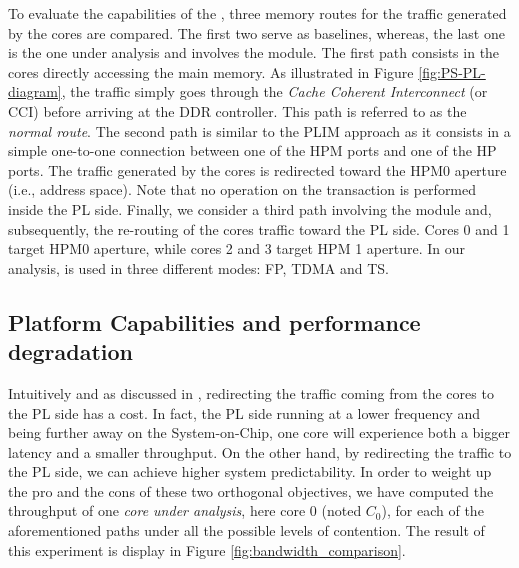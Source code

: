 To evaluate the capabilities of the \schim, three memory routes for
the traffic generated by the cores are compared. The first two serve
as baselines, whereas, the last one is the one under analysis and
involves the \schim module.  The first path consists in the cores
directly accessing the main memory. As illustrated in Figure
\ref{fig:PS-PL-diagram}, the traffic simply goes through the
\emph{Cache Coherent Interconnect} (or CCI) before arriving at the DDR
controller. This path is referred to as the \emph{normal route}. The
second path is similar to the PLIM approach as it consists in a simple
one-to-one connection between one of the HPM ports and one of the HP
ports. The traffic generated by the cores is redirected toward the
HPM0 aperture (i.e., address space). Note that no operation on the
transaction is performed inside the PL side. Finally, we consider a
third path involving the \schim module and, subsequently, the
re-routing of the cores traffic toward the PL side. Cores 0 and 1
target HPM0 aperture, while cores 2 and 3 target HPM 1 aperture. In
our analysis, \schim is used in three different modes: FP, TDMA and
TS.

  \subsection{Platform Capabilities and performance degradation}
    \label{subsec:platform-capabilities-and-performance-degradation}
    Intuitively and as discussed in \cite{PLIM20}, redirecting the traffic coming from the cores to the PL side has a cost. In fact, the PL side running at a lower frequency and being further away on the System-on-Chip, one core will experience both a bigger latency and a smaller throughput. On the other hand, by redirecting the traffic to the PL side, we can achieve higher system predictability.    
    In order to weight up the pro and the cons of these two orthogonal objectives, we have computed the throughput of one \emph{core under analysis}, here core 0 (noted $C_{0}$), for each of the aforementioned paths under all the possible levels of contention. The result of this experiment is display in Figure \ref{fig:bandwidth_comparison}.
    
